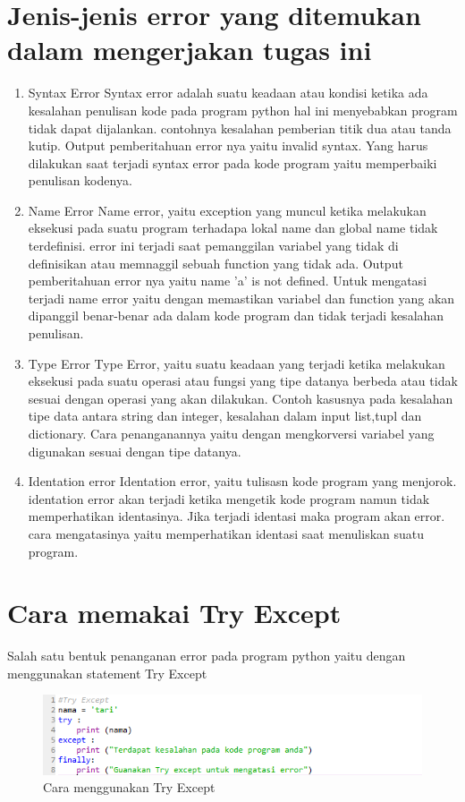 \section{Jenis-jenis error yang ditemukan dalam mengerjakan tugas ini}
\begin{enumerate}
    \item Syntax Error
    Syntax error adalah suatu keadaan atau kondisi ketika ada kesalahan penulisan kode pada program python hal ini menyebabkan program tidak dapat dijalankan. contohnya kesalahan pemberian titik dua atau tanda kutip. Output pemberitahuan error nya yaitu invalid syntax. Yang harus dilakukan saat terjadi syntax error pada kode program yaitu memperbaiki penulisan kodenya.
    \item Name Error
    Name error, yaitu exception yang muncul ketika melakukan eksekusi pada suatu program terhadapa lokal name dan global name tidak terdefinisi. error ini terjadi saat pemanggilan variabel yang tidak di definisikan atau memnaggil sebuah function yang tidak ada. Output pemberitahuan error nya yaitu name 'a' is not defined. Untuk mengatasi terjadi name error yaitu dengan memastikan variabel dan function yang akan dipanggil benar-benar ada dalam kode program dan tidak terjadi kesalahan penulisan.
    \item Type Error
    Type Error, yaitu suatu keadaan yang terjadi ketika melakukan eksekusi pada suatu operasi atau fungsi yang tipe datanya berbeda atau tidak sesuai dengan operasi yang akan dilakukan. Contoh kasusnya pada kesalahan tipe data antara string dan integer, kesalahan dalam input list,tupl dan dictionary. Cara penanganannya yaitu dengan mengkorversi variabel yang digunakan sesuai dengan tipe datanya.
    \item Identation error
    Identation error, yaitu tulisasn kode program yang menjorok. identation error akan terjadi ketika mengetik kode program namun tidak memperhatikan identasinya. Jika terjadi identasi maka program akan error. cara mengatasinya yaitu memperhatikan identasi saat menuliskan suatu program.
\end{enumerate}
\newpage
\section{Cara memakai Try Except}
    Salah satu bentuk penanganan error pada program python yaitu dengan menggunakan statement Try Except 
    \begin{figure}[!htbp]
        \centering
        \includegraphics[width=15cm]{figures/tryexcept.PNG}
        \caption{Cara menggunakan Try Except}
    \end{figure}

    
    



    

    
    
 

